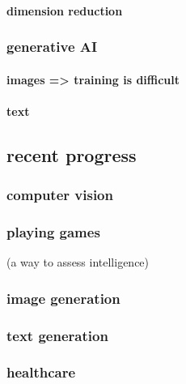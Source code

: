 \paragraph{dimension reduction}
\subsubsection{generative AI}
\paragraph{images => training is difficult}
\paragraph{text}

\subsection{recent progress}
\subsubsection{computer vision}
\subsubsection{playing games}
(a way to assess intelligence)
\subsubsection{image generation}
\subsubsection{text generation}
\subsubsection{healthcare}

